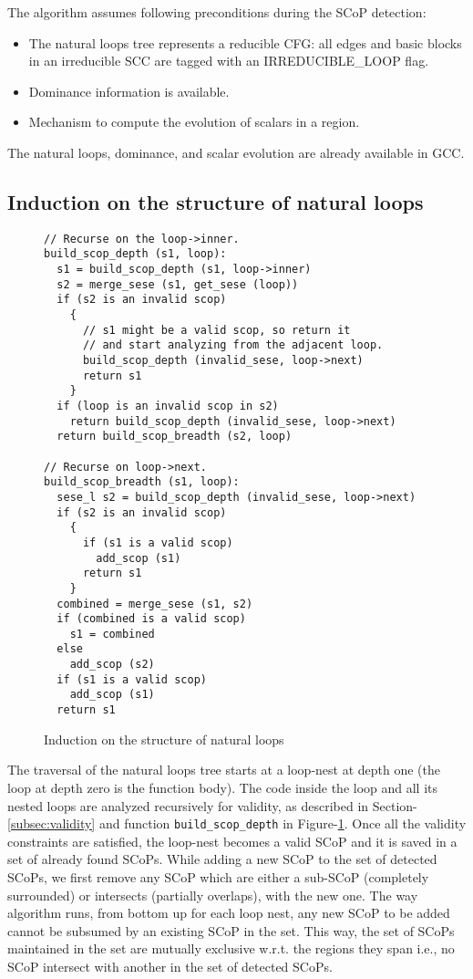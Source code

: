 \documentclass{sig-alternate}
\begin{document}
The algorithm assumes following preconditions during the SCoP detection:
\begin{itemize}
\item The natural loops tree represents a reducible CFG: all edges and basic
  blocks in an irreducible SCC are tagged with an IRREDUCIBLE\_LOOP flag.
\item Dominance information is available.
\item Mechanism to compute the evolution of scalars in a region.
\end{itemize}

The natural loops, dominance, and scalar evolution are already available in
GCC.

\subsection{Induction on the structure of natural loops}
\label{subsec:induction}

\begin{figure}
\begin{verbatim}
// Recurse on the loop->inner.
build_scop_depth (s1, loop):
  s1 = build_scop_depth (s1, loop->inner)
  s2 = merge_sese (s1, get_sese (loop))
  if (s2 is an invalid scop)
    {
      // s1 might be a valid scop, so return it
      // and start analyzing from the adjacent loop.
      build_scop_depth (invalid_sese, loop->next)
      return s1
    }
  if (loop is an invalid scop in s2)
    return build_scop_depth (invalid_sese, loop->next)
  return build_scop_breadth (s2, loop)

// Recurse on loop->next.
build_scop_breadth (s1, loop):
  sese_l s2 = build_scop_depth (invalid_sese, loop->next)
  if (s2 is an invalid scop)
    {
      if (s1 is a valid scop)
        add_scop (s1)
      return s1
    }
  combined = merge_sese (s1, s2)
  if (combined is a valid scop)
    s1 = combined
  else
    add_scop (s2)
  if (s1 is a valid scop)
    add_scop (s1)
  return s1
\end{verbatim}
\caption{Induction on the structure of natural loops}
\label{fig:induction}
\end{figure}

The traversal of the natural loops tree starts at a loop-nest at depth one
(the loop at depth zero is the function body).
The code inside the loop and all its nested loops are analyzed recursively for
validity, as described in Section-\ref{subsec:validity} and
function \texttt{build\_scop\_depth} in
Figure-\ref{fig:induction}.  Once all the validity constraints are satisfied,
the loop-nest becomes a valid SCoP and it is saved in a set of
already found SCoPs. While adding a new SCoP to the set of detected SCoPs, we
first remove any SCoP which are either a sub-SCoP (completely surrounded) or
intersects (partially overlaps), with the new one. The way algorithm runs, from
bottom up for each loop nest, any new SCoP to be added cannot be subsumed by an
existing SCoP in the set. This way, the set of SCoPs maintained in the set are
mutually exclusive w.r.t. the regions they span i.e., no SCoP intersect with
another in the set of detected SCoPs.
\end{document}
